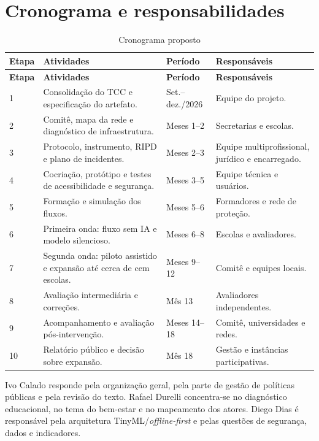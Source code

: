 \documentclass[
  12pt,
  openright,
  oneside,
  a4paper,
  english,
  brazil
]{abntex2}
\begin{document}
\chapter{Cronograma e responsabilidades}

\begin{longtable}{p{1.2cm}p{5.6cm}p{2.4cm}p{4cm}}
\caption{Cronograma proposto}\label{tab:cronograma}\\
\toprule
\textbf{Etapa} & \textbf{Atividades} & \textbf{Período} & \textbf{Responsáveis} \\
\midrule
\endfirsthead
\toprule
\textbf{Etapa} & \textbf{Atividades} & \textbf{Período} & \textbf{Responsáveis} \\
\midrule
\endhead
1 & Consolidação do TCC e especificação do artefato. & Set.--dez./2026 & Equipe do projeto. \\
2 & Comitê, mapa da rede e diagnóstico de infraestrutura. & Meses 1--2 & Secretarias e escolas. \\
3 & Protocolo, instrumento, RIPD e plano de incidentes. & Meses 2--3 & Equipe multiprofissional, jurídico e encarregado. \\
4 & Cocriação, protótipo e testes de acessibilidade e segurança. & Meses 3--5 & Equipe técnica e usuários. \\
5 & Formação e simulação dos fluxos. & Meses 5--6 & Formadores e rede de proteção. \\
6 & Primeira onda: fluxo sem IA e modelo silencioso. & Meses 6--8 & Escolas e avaliadores. \\
7 & Segunda onda: piloto assistido e expansão até cerca de cem escolas. & Meses 9--12 & Comitê e equipes locais. \\
8 & Avaliação intermediária e correções. & Mês 13 & Avaliadores independentes. \\
9 & Acompanhamento e avaliação pós-intervenção. & Meses 14--18 & Comitê, universidades e redes. \\
10 & Relatório público e decisão sobre expansão. & Mês 18 & Gestão e instâncias participativas. \\
\bottomrule
\end{longtable}


Ivo Calado responde pela organização geral, pela parte de gestão de políticas
públicas e pela revisão do texto. Rafael Durelli concentra-se no diagnóstico
educacional, no tema do bem-estar e no mapeamento dos atores. Diego Dias é
responsável pela arquitetura TinyML/\emph{offline-first} e pelas questões de
segurança, dados e indicadores.
\end{document}
